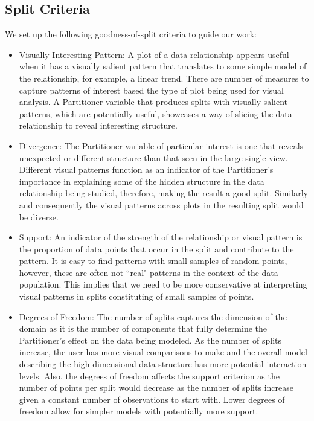 \subsection{Split Criteria}
We set up the following goodness-of-split criteria to guide our work:
\begin{itemize}
\item Visually Interesting Pattern: A plot of a data relationship appears useful when it has a visually salient pattern that translates to some simple model of the relationship, for example, a linear trend. There are number of measures to capture patterns of interest based the type of plot being used for visual analysis. A Partitioner variable that produces splits with visually salient patterns, which are potentially useful, showcases a way of slicing the data relationship to reveal interesting structure.
\item Divergence: The Partitioner variable of particular interest is one that reveals unexpected or different structure than that seen in the large single view. Different visual patterns function as an indicator of the Partitioner's importance in explaining some of the hidden structure in the data relationship being studied, therefore, making the result a good split. Similarly and consequently the visual patterns across plots in the resulting split would be diverse.
\item Support: An indicator of the strength of the relationship or visual pattern is the proportion of data points that occur in the split and contribute to the pattern. It is easy to find patterns with small samples of random points, however, these are often not ``real" patterns in the context of the data population. This implies that we need to be more conservative at interpreting visual patterns in splits constituting of small samples of points.
\item Degrees of Freedom: The number of splits captures the dimension of the domain as it is the number of components that fully determine the Partitioner's effect on the data being modeled. As the number of splits increase, the user has more visual comparisons to make and the overall model describing the high-dimensional data structure has more potential interaction levels. Also, the degrees of freedom affects the support criterion as the number of points per split would decrease as the number of splits increase given a constant number of observations to start with. Lower degrees of freedom allow for simpler models with potentially more support.
\end{itemize}


